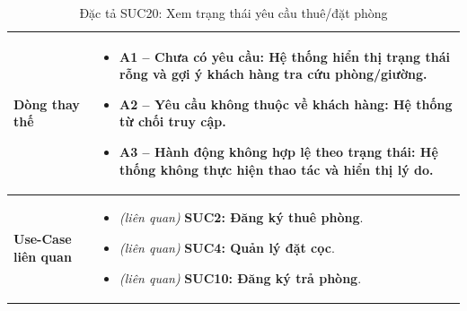\begin{table}[H]
\begin{tabularx}{\textwidth}{|>{\centering\arraybackslash\bfseries}m{3.5cm}|X|}
    \hline
    Dòng thay thế &
    \begin{itemize}[leftmargin=*, nosep, label=-]
        \vspace{0.1cm}
        \item \textbf{A1 -- Chưa có yêu cầu:} Hệ thống hiển thị trạng thái rỗng và gợi ý khách hàng tra cứu phòng/giường.
        \item \textbf{A2 -- Yêu cầu không thuộc về khách hàng:} Hệ thống từ chối truy cập.
        \item \textbf{A3 -- Hành động không hợp lệ theo trạng thái:} Hệ thống không thực hiện thao tác và hiển thị lý do.
    \end{itemize} \\
    \hline
    Use-Case liên quan &
    \begin{itemize}[leftmargin=*, nosep, label=-]
        \vspace{0.1cm}
        \item \textit{(liên quan)} \textbf{SUC2: Đăng ký thuê phòng}.
        \item \textit{(liên quan)} \textbf{SUC4: Quản lý đặt cọc}.
        \item \textit{(liên quan)} \textbf{SUC10: Đăng ký trả phòng}.
\end{itemize} \\
    \hline
\end{tabularx}
\caption{Đặc tả SUC20: Xem trạng thái yêu cầu thuê/đặt phòng}
\end{table}


\vspace{1cm}

